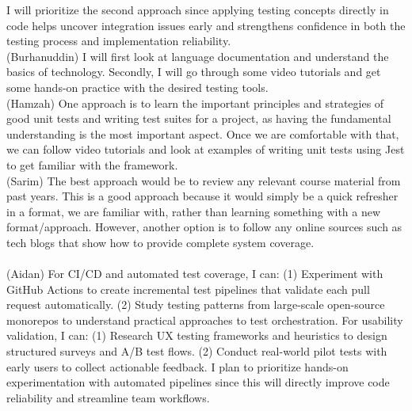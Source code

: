 \documentclass[12pt, titlepage]{article}
\begin{document}
\begin{enumerate}
I will prioritize the second approach since applying testing concepts directly in code helps uncover integration issues early and strengthens confidence in both the testing process and implementation reliability.
\\
(Burhanuddin)
I will first look at language documentation and understand the basics of technology. Secondly, I will go through some video tutorials and get some hands-on practice with the desired testing tools.  
\\
(Hamzah)
One approach is to learn the important principles and strategies of good unit tests and writing test suites for a project, as having the fundamental understanding is the most important aspect. Once we are comfortable with that, we can follow video tutorials and look at examples of writing unit tests using Jest to get familiar with the framework.  
\\
(Sarim)
The best approach would be to review any relevant course material from past years. This is a good approach because it would simply be a quick refresher in a format, we are familiar with, rather than learning something with a new format/approach. However, another option is to follow any online sources such as tech blogs that show how to provide complete system coverage. 
\\
\\(Aidan) For CI/CD and automated test coverage, I can:  
(1) Experiment with GitHub Actions to create incremental test pipelines that validate each pull request automatically.  
(2) Study testing patterns from large-scale open-source monorepos to understand practical approaches to test orchestration.  
For usability validation, I can:  
(1) Research UX testing frameworks and heuristics to design structured surveys and A/B test flows.  
(2) Conduct real-world pilot tests with early users to collect actionable feedback.  
I plan to prioritize hands-on experimentation with automated pipelines since this will directly improve code reliability and streamline team workflows.

\end{enumerate}
\end{document}
